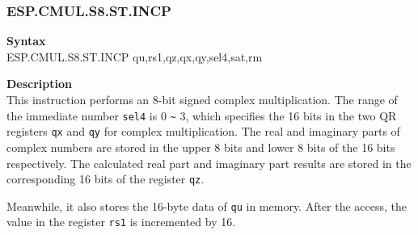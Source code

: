 \newpage
\subsubsection{ESP.CMUL.S8.ST.INCP}\label{instruction:ESPCMULS8STINCP}
\textbf{Syntax}\\
ESP.CMUL.S8.ST.INCP qu,rs1,qz,qx,qy,sel4,sat,rm

\textbf{Description}\\
This instruction performs an 8-bit signed complex multiplication. The range of the immediate number \lstinline{sel4} is 0 \verb+~+ 3, which specifies the 16 bits in the two QR registers \lstinline{qx} and \lstinline{qy} for complex multiplication. The real and imaginary parts of complex numbers are stored in the upper 8 bits and lower 8 bits of the 16 bits respectively. The calculated real part and imaginary part results are stored in the corresponding 16 bits of the register \lstinline{qz}.

Meanwhile, it also stores the 16-byte data of \lstinline{qu} in memory. After the access, the value in the register \lstinline{rs1} is incremented by 16.

